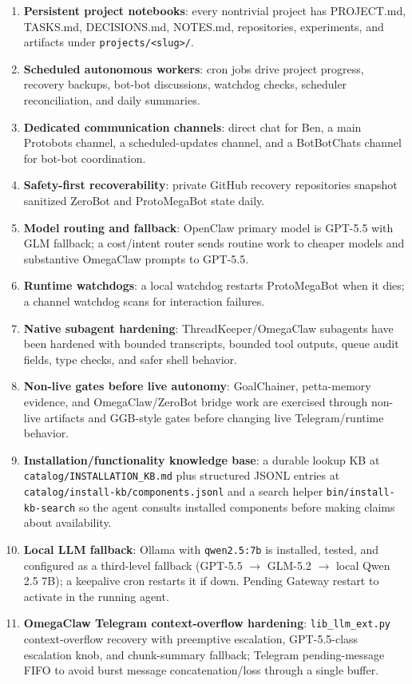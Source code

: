 \documentclass[11pt]{article}
\begin{document}
\begin{enumerate}[label=\arabic*.]
  \item \textbf{Persistent project notebooks}: every nontrivial project has PROJECT.md, TASKS.md, DECISIONS.md, NOTES.md, repositories, experiments, and artifacts under \texttt{projects/<slug>/}.
  \item \textbf{Scheduled autonomous workers}: cron jobs drive project progress, recovery backups, bot-bot discussions, watchdog checks, scheduler reconciliation, and daily summaries.
  \item \textbf{Dedicated communication channels}: direct chat for Ben, a main Protobots channel, a scheduled-updates channel, and a BotBotChats channel for bot-bot coordination.
  \item \textbf{Safety-first recoverability}: private GitHub recovery repositories snapshot sanitized ZeroBot and ProtoMegaBot state daily.
  \item \textbf{Model routing and fallback}: OpenClaw primary model is GPT-5.5 with GLM fallback; a cost/intent router sends routine work to cheaper models and substantive OmegaClaw prompts to GPT-5.5.
  \item \textbf{Runtime watchdogs}: a local watchdog restarts ProtoMegaBot when it dies; a channel watchdog scans for interaction failures.
  \item \textbf{Native subagent hardening}: ThreadKeeper/OmegaClaw subagents have been hardened with bounded transcripts, bounded tool outputs, queue audit fields, type checks, and safer shell behavior.
  \item \textbf{Non-live gates before live autonomy}: GoalChainer, petta-memory evidence, and OmegaClaw/ZeroBot bridge work are exercised through non-live artifacts and GGB-style gates before changing live Telegram/runtime behavior.
\item \textbf{Installation/functionality knowledge base}: a durable lookup KB at \texttt{catalog/INSTALLATION\_KB.md} plus structured JSONL entries at \texttt{catalog/install-kb/components.jsonl} and a search helper \texttt{bin/install-kb-search} so the agent consults installed components before making claims about availability.
\item \textbf{Local LLM fallback}: Ollama with \texttt{qwen2.5:7b} is installed, tested, and configured as a third-level fallback (GPT-5.5 $\to$ GLM-5.2 $\to$ local Qwen 2.5 7B); a keepalive cron restarts it if down. Pending Gateway restart to activate in the running agent.
\item \textbf{OmegaClaw Telegram context-overflow hardening}: \texttt{lib\_llm\_ext.py} context-overflow recovery with preemptive escalation, GPT-5.5-class escalation knob, and chunk-summary fallback; Telegram pending-message FIFO to avoid burst message concatenation/loss through a single buffer.

\end{enumerate}
\end{document}
